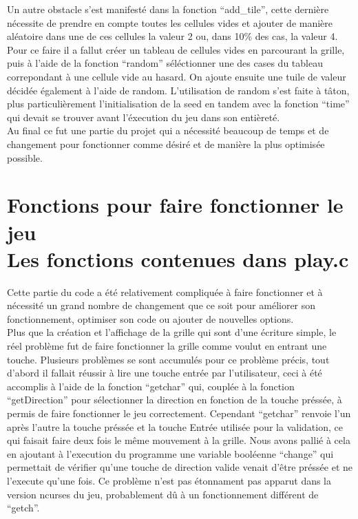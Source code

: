 \documentclass[12pt]{article}
\begin{document}
Un autre obstacle s'est manifesté dans la fonction ``add\_tile'', cette dernière nécessite de prendre en compte toutes les cellules vides et ajouter de manière aléatoire dans une de ces cellules la valeur 2 ou, dans 10\% des cas, la valeur 4.\\

Pour ce faire il a fallut créer un tableau de cellules vides en parcourant la grille, puis à l'aide de la fonction ``random'' séléctionner une des cases du tableau correpondant à une cellule vide au hasard. On ajoute ensuite une tuile de valeur décidée également à l'aide de random. L'utilisation de random s'est faite à tâton, plus particulièrement l'initialisation de la seed en tandem avec la fonction ``time'' qui devait se trouver avant l'éxecution du jeu dans son entièreté.\\

Au final ce fut une partie du projet qui a nécessité beaucoup de temps et de changement pour fonctionner comme désiré et de manière la plus optimisée possible.

\section{Fonctions pour faire fonctionner le jeu
\\{\small Les fonctions contenues dans play.c}}

Cette partie du code a été relativement compliquée à faire fonctionner et à nécessité un grand nombre de changement que ce soit pour améliorer son fonctionnement, optimiser son code ou ajouter de nouvelles options.\\

Plus que la création et l'affichage de la grille qui sont d'une écriture simple, le réel problème fut de faire fonctionner la grille comme voulut en entrant une touche. Plusieurs problèmes se sont accumulés pour ce problème précis, tout d'abord il fallait réussir à lire une touche entrée par l'utilisateur, ceci à été accomplis à l'aide de la fonction ``getchar'' qui, couplée à la fonction ``getDirection'' pour sélectionner la direction en fonction de la touche préssée, à permis de faire fonctionner le jeu correctement. Cependant ``getchar'' renvoie l'un après l'autre la touche préssée et la touche Entrée utilisée pour la validation, ce qui faisait faire deux fois le même mouvement à la grille. Nous avons pallié à cela en ajoutant à l'execution du programme une variable booléenne ``change'' qui permettait de vérifier qu'une touche de direction valide venait d'être préssée et ne l'execute qu'une fois. Ce problème n'est pas étonnament pas apparut dans la version ncurses du jeu, probablement dû à un fonctionnement différent de ``getch''.\\
\end{document}
